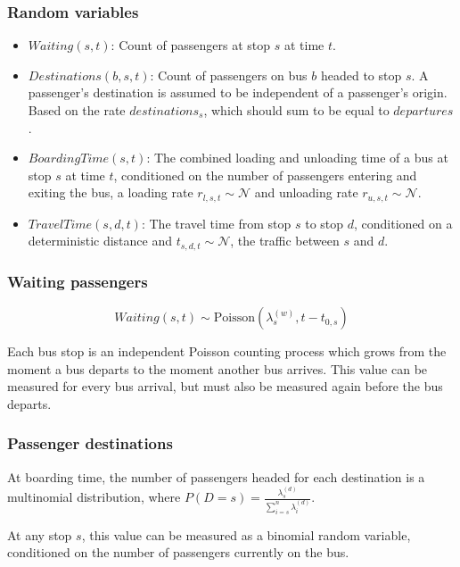 \documentclass[xcolor=x11names,compress, 10pt]{beamer}
\renewcommand{\(}{\begin{columns}}
\renewcommand{\)}{\end{columns}}
\newcommand{\<}[1]{\begin{column}{#1}}
\renewcommand{\>}{\end{column}}
\begin{document}
\begin{frame}
    \frametitle{Random variables}

    \begin{itemize}
        \item $Waiting(s, t)$: Count of passengers at stop $s$ at time
            $t$.
        \item $Destinations(b, s, t)$: Count of passengers on bus
            $b$ headed to stop $s$. A passenger's destination is assumed
            to be independent of a passenger's origin. Based on the rate
            $destinations_s$, which should sum to be equal to
            $departures$.
        \item $BoardingTime(s, t)$: The combined loading and unloading
            time of a bus at stop $s$ at time $t$, conditioned on the
            number of passengers entering and exiting the bus, a loading
            rate $r_{l,s,t}\sim\mathcal N$ and unloading rate
            $r_{u,s,t}\sim\mathcal N$.
        \item $TravelTime(s, d, t)$: The travel time from stop $s$ to
            stop $d$, conditioned on a deterministic distance and
            $t_{s,d,t}\sim\mathcal N$, the traffic between $s$ and $d$.
    \end{itemize}
\end{frame}

\begin{frame}
    \frametitle{Waiting passengers}

    \[
        Waiting(s, t) \sim \text{Poisson}(\lambda^{(w)}_s, t -
        t_{0,s})
    \]

    Each bus stop is an independent Poisson counting process which grows
    from the moment a bus departs to the moment another bus arrives.
    This value can be measured for every bus arrival, but must also be
    measured again before the bus departs.

\end{frame}

\begin{frame}
    \frametitle{Passenger destinations}

    At boarding time, the number of passengers headed for each
    destination is a multinomial distribution, where $P(D = s) =
    \frac{\lambda^{(d)}_s}{\sum_{i=s}^n\lambda^{(d)}_i}$.

    At any stop $s$, this value can be measured as a binomial random
    variable, conditioned on the number of passengers currently on the
    bus.

\end{frame}
\end{document}
